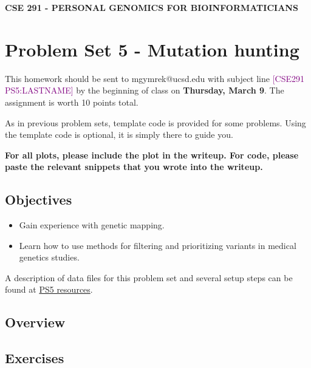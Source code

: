 \documentclass[12pt]{article}
\begin{document}
\textbf{CSE 291 - PERSONAL GENOMICS FOR BIOINFORMATICIANS}

\section*{Problem Set 5 - Mutation hunting}

This homework should be sent to mgymrek@ucsd.edu with subject line \textcolor{purple}{[CSE291 PS5:LASTNAME]} by the beginning of class on \textbf{Thursday, March 9}. The assignment is worth 10 points total.

As in previous problem sets, template code is provided for some problems. Using the template code is optional, it is simply there to guide you.

\textbf{For all plots, please include the plot in the writeup. For code, please paste the relevant snippets that you wrote into the writeup.}

\subsection*{Objectives}
\begin{itemize}
\item Gain experience with genetic mapping.
\item Learn how to use methods for filtering and prioritizing variants in medical genetics studies.
\end{itemize}

A description of data files for this problem set and several setup steps can be found at \href{https://gymreklab.github.io/teaching/personal\_genomics/ps5\_resources.html}{PS5 resources}. 

\subsection*{Overview}



\subsection*{Exercises}
\end{document}
